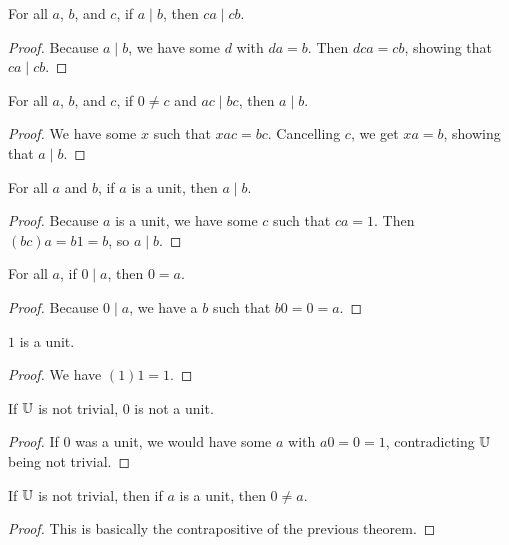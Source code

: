 \documentclass[../../math.tex]{subfiles}
\begin{document}
\begin{theorem} \label{div_lmult} \label{div_rmult}
    For all $a$, $b$, and $c$, if $a \mid b$, then $ca \mid cb$.
\end{theorem}
\begin{proof}
    Because $a \mid b$, we have some $d$ with $da = b$.  Then $dca = cb$,
    showing that $ca \mid cb$.
\end{proof}

\begin{theorem} \label{div_rcancel} \label{div_lcancel}
    For all $a$, $b$, and $c$, if $0 \neq c$ and $ac \mid bc$, then $a \mid b$.
\end{theorem}
\begin{proof}
    We have some $x$ such that $xac = bc$.  Cancelling $c$, we get $xa = b$,
    showing that $a \mid b$.
\end{proof}

\begin{theorem} \label{unit_div}
    For all $a$ and $b$, if $a$ is a unit, then $a \mid b$.
\end{theorem}
\begin{proof}
    Because $a$ is a unit, we have some $c$ such that $ca = 1$.  Then $(bc)a =
    b1 = b$, so $a \mid b$.
\end{proof}

\begin{theorem} \label{div_zero}
    For all $a$, if $0 \mid a$, then $0 = a$.
\end{theorem}
\begin{proof}
    Because $0 \mid a$, we have a $b$ such that $b0 = 0 = a$.
\end{proof}

\begin{theorem} \label{one_unit}
    $1$ is a unit.
\end{theorem}
\begin{proof}
    We have $(1)1 = 1$.
\end{proof}

\begin{theorem} \label{zero_not_unit}
    If $\mathbb{U}$ is not trivial, $0$ is not a unit.
\end{theorem}
\begin{proof}
    If $0$ was a unit, we would have some $a$ with $a0 = 0 = 1$, contradicting
    $\mathbb{U}$ being not trivial.
\end{proof}

\begin{theorem} \label{unit_nz}
    If $\mathbb{U}$ is not trivial, then if $a$ is a unit, then $0 \neq a$.
\end{theorem}
\begin{proof}
    This is basically the contrapositive of the previous theorem.
\end{proof}
\end{document}

